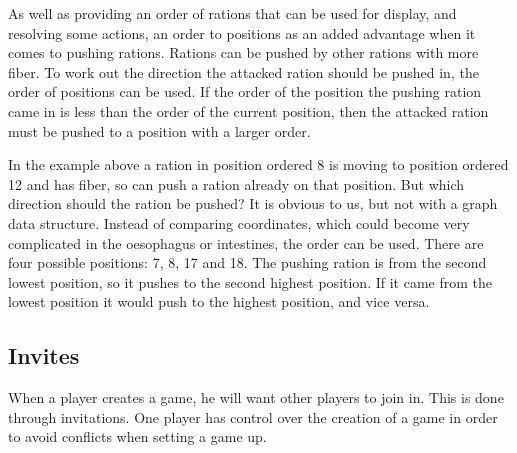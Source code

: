 As well as providing an order of rations that can be used for display, and resolving some actions, an order to positions as an added advantage when it comes to pushing rations. Rations can be pushed by other rations with more fiber. To work out the direction the attacked ration should be pushed in, the order of positions can be used. If the order of the position the pushing ration came in is less than the order of the current position, then the attacked ration must be pushed to a position with a larger order.

\begin{center}
\end{center}

In the example above a ration in position ordered 8 is moving to position ordered 12 and has fiber, so can push a ration already on that position. But which direction should the ration be pushed? It is obvious to us, but not with a graph data structure. Instead of comparing coordinates, which could become very complicated in the oesophagus or intestines, the order can be used. There are four possible positions: 7, 8, 17 and 18. The pushing ration is from the second lowest position, so it pushes to the second highest position. If it came from the lowest position it would push to the highest position, and vice versa.

\subsection{Invites}
When a player creates a game, he will want other players to join in. This is done through invitations. One player has control over the creation of a game in order to avoid conflicts when setting a game up.

